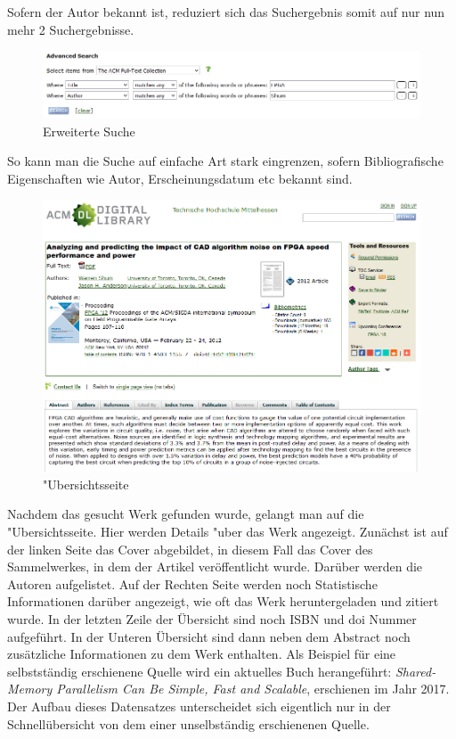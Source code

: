 \documentclass[
	ngerman,
	parskip=half,
	headsepline,
	fontsize=12pt,
	DIV=13,
	listof=leveldown,
	]{scrreprt}
\begin{document}
Sofern der Autor bekannt ist, reduziert sich das Suchergebnis somit auf nur nun mehr 2 Suchergebnisse.
\begin{figure}[ht]
\centering
\includegraphics[width=\textwidth]{img/Suche_FPGA-Shum.PNG}
\caption{Erweiterte Suche}
\end{figure}
So kann man die Suche auf einfache Art stark eingrenzen, sofern Bibliografische Eigenschaften wie Autor, Erscheinungsdatum etc bekannt sind.\\
\begin{figure}[ht]
\centering
\includegraphics[width=\textwidth]{img/Details.PNG}
\caption{"Ubersichtsseite}
\end{figure}
\newpage
Nachdem das gesucht Werk gefunden wurde, gelangt man auf die "Ubersichtsseite. Hier werden Details "uber das Werk angezeigt. Zunächst ist auf der linken Seite das Cover abgebildet, in diesem Fall das Cover des Sammelwerkes, in dem der Artikel veröffentlicht wurde. Darüber werden die Autoren aufgelistet. Auf der Rechten Seite werden noch Statistische Informationen darüber angezeigt, wie oft das Werk heruntergeladen und zitiert wurde.
In der letzten Zeile der Übersicht sind noch ISBN und doi Nummer aufgeführt.
In der Unteren Übersicht sind dann neben dem Abstract noch zusätzliche Informationen zu dem Werk enthalten.
\newpage
Als Beispiel für eine selbstständig erschienene Quelle wird ein aktuelles Buch herangeführt: \textit{Shared-Memory Parallelism Can Be Simple, Fast and Scalable}, erschienen im Jahr 2017. Der Aufbau dieses Datensatzes unterscheidet sich eigentlich nur in der Schnellübersicht von dem einer unselbständig erschienenen Quelle.
\end{document}
